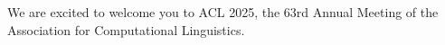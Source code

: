 We are excited to welcome you to ACL 2025, the 63rd Annual Meeting of the Association for Computational Linguistics.
